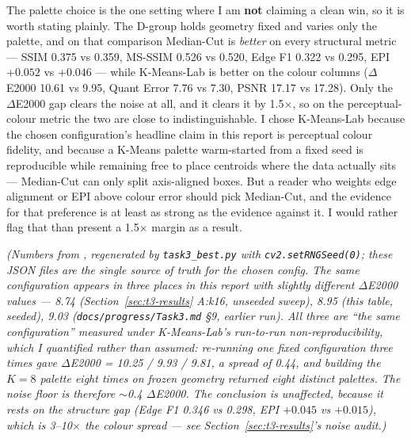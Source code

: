 \documentclass[11pt,a4paper]{article}
\begin{document}
The palette choice is the one setting where I am \textbf{not} claiming a clean
win, so it is worth stating plainly. The D-group holds geometry fixed and varies
only the palette, and on that comparison Median-Cut is \emph{better} on every
structural metric --- SSIM 0.375 vs 0.359, MS-SSIM 0.526 vs 0.520, Edge F1 0.322
vs 0.295, EPI $+0.052$ vs $+0.046$ --- while K-Means-Lab is better on the colour
columns ($\Delta$E2000 10.61 vs 9.95, Quant Error 7.76 vs 7.30, PSNR 17.17 vs
17.28). Only the $\Delta$E2000 gap clears the noise at all, and it clears it by
1.5$\times$, so on the perceptual-colour metric the two are close to
indistinguishable. I chose K-Means-Lab because the chosen configuration's
headline claim in this report is perceptual colour fidelity, and because a
K-Means palette warm-started from a fixed seed is reproducible while remaining
free to place centroids where the data actually sits --- Median-Cut can only
split axis-aligned boxes. But a reader who weights edge alignment or EPI above
colour error should pick Median-Cut, and the evidence for that preference is at
least as strong as the evidence against it. I would rather flag that than
present a 1.5$\times$ margin as a result.

\emph{(Numbers from , regenerated by
\texttt{task3\_best.py} with \texttt{cv2.setRNGSeed(0)}; these JSON files are the
single source of truth for the chosen config. The same configuration appears in
three places in this report with slightly different $\Delta$E2000 values ---
8.74 (Section~\ref{sec:t3-results} A:k16, unseeded sweep), 8.95 (this table,
seeded), 9.03 (\texttt{docs/progress/Task3.md} \S9, earlier run). All three are
``the same configuration'' measured under K-Means-Lab's run-to-run
non-reproducibility, which I quantified rather than assumed: re-running one
fixed configuration three times gave $\Delta$E2000 = 10.25 / 9.93 / 9.81, a
spread of 0.44, and building the $K=8$ palette eight times on frozen geometry
returned eight distinct palettes. The noise floor is therefore $\sim$0.4
$\Delta$E2000. The conclusion is unaffected, because it rests on the structure
gap (Edge F1 0.346 vs 0.298, EPI $+0.045$ vs $+0.015$), which is 3--10$\times$
the colour spread --- see Section~\ref{sec:t3-results}'s noise audit.)}
\end{document}

